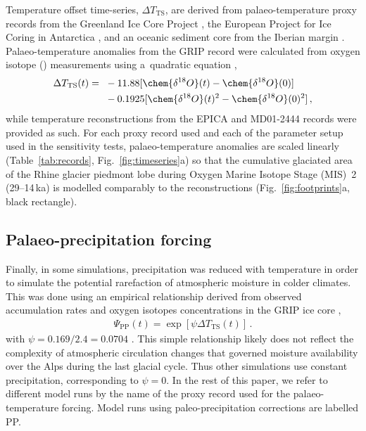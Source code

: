 \documentclass[tc, manuscript]{copernicus}
\begin{document}
    Temperature offset time-series, ${\Delta}T_{\text{TS}}$, are derived from
    palaeo-temperature proxy records from the Greenland Ice Core Project
    \citep[GRIP,][]{Dansgaard.etal.1993}, the European Project for Ice Coring
    in Antarctica \citep[EPICA,][] {Jouzel.etal.2007}, and an oceanic sediment
    core from the Iberian margin \citep[MD01-2444,][]{Martrat.etal.2007}.
    Palaeo-temperature anomalies from the GRIP record were calculated from
    oxygen isotope () measurements using a~quadratic
    equation \citep{Johnsen.etal.1995},
    \begin{align}
      {\Delta}T_{\text{TS}}(t) ={~}&-11.88 [\chem{\delta^{18}O}(t)
                                    -\chem{\delta^{18}O}(0)] \nonumber \\
                                   &-0.1925 [\chem{\delta^{18}O}(t)^2
                                    -\chem{\delta^{18}O}(0)^2] \,,
    \end{align}
    while temperature reconstructions from the EPICA and MD01-2444 records were
    provided as such. For each proxy record used and each of the parameter
    setup used in the sensitivity tests, palaeo-temperature anomalies are
    scaled linearly (Table~\ref{tab:records}, Fig.~\ref{fig:timeseries}a) so
    that the cumulative glaciated area of the Rhine glacier piedmont lobe
    during Oxygen Marine Isotope Stage (MIS)~2 (29--14\,ka) is modelled
    comparably to the reconstructions (Fig.~\ref{fig:footprints}a, black
    rectangle).


\subsection{Palaeo-precipitation forcing}
\label{sec:palprec}

    Finally, in some simulations, precipitation was reduced with temperature in
    order to simulate the potential rarefaction of atmospheric moisture in
    colder climates. This was done using an empirical relationship derived from
    observed accumulation rates and oxygen isotopes concentrations in the GRIP
    ice core \citep{Dahl-Jensen.etal.1993},
    \begin{align}
      {\Psi}_{\text{PP}}(t) = \exp[\psi{\Delta}T_{\text{TS}}(t)] \,.
    \end{align}
    with $\psi=0.169/2.4=0.0704$ \citep{Huybrechts.2002}. This simple
    relationship likely does not reflect the complexity of atmospheric
    circulation changes that governed moisture availability over the Alps
    during the last glacial cycle. Thus other simulations use constant
    precipitation, corresponding to $\psi=0$. In the rest of this paper, we
    refer to different model runs by the name of the proxy record used for the
    palaeo-temperature forcing. Model runs using paleo-precipitation
    corrections are labelled PP.
\end{document}
